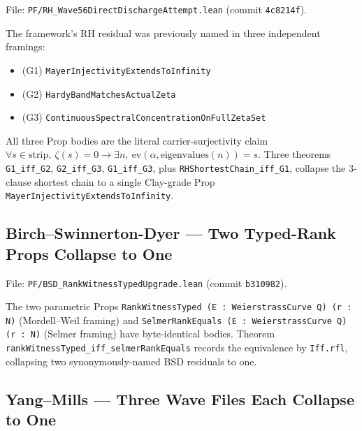File: \texttt{PF/RH\_Wave56DirectDischargeAttempt.lean} (commit
\texttt{4c8214f}).

The framework's RH residual was previously named in three independent
framings:
\begin{itemize}
  \item (G1) \texttt{MayerInjectivityExtendsToInfinity}~\cite{mayer1991}
  \item (G2) \texttt{HardyBandMatchesActualZeta}~\cite{hardy1914}
  \item (G3) \texttt{ContinuousSpectralConcentrationOnFullZetaSet}
\end{itemize}
All three Prop bodies are the literal carrier-surjectivity claim
$\forall s \in \mathrm{strip},\ \zeta(s) = 0 \to \exists n,\
\mathrm{ev}(\alpha, \mathrm{eigenvalues}(n)) = s$. Three theorems
\verb|G1_iff_G2|, \verb|G2_iff_G3|, \verb|G1_iff_G3|, plus
\verb|RHShortestChain_iff_G1|, collapse the 3-clause shortest chain
to a single Clay-grade Prop \verb|MayerInjectivityExtendsToInfinity|.

\subsection{Birch--Swinnerton-Dyer --- Two Typed-Rank Props Collapse to One}
\label{subsec:residual-bsd}

File: \texttt{PF/BSD\_RankWitnessTypedUpgrade.lean} (commit
\texttt{b310982}).

The two parametric Props
\verb|RankWitnessTyped (E : WeierstrassCurve Q) (r : N)| (Mordell--Weil
framing) and \verb|SelmerRankEquals (E : WeierstrassCurve Q) (r : N)|
(Selmer framing) have byte-identical bodies. Theorem
\verb|rankWitnessTyped_iff_selmerRankEquals| records the equivalence
by \verb|Iff.rfl|, collapsing two synonymously-named BSD residuals to one.

\subsection{Yang--Mills --- Three Wave Files Each Collapse to One}
\label{subsec:residual-ym}

